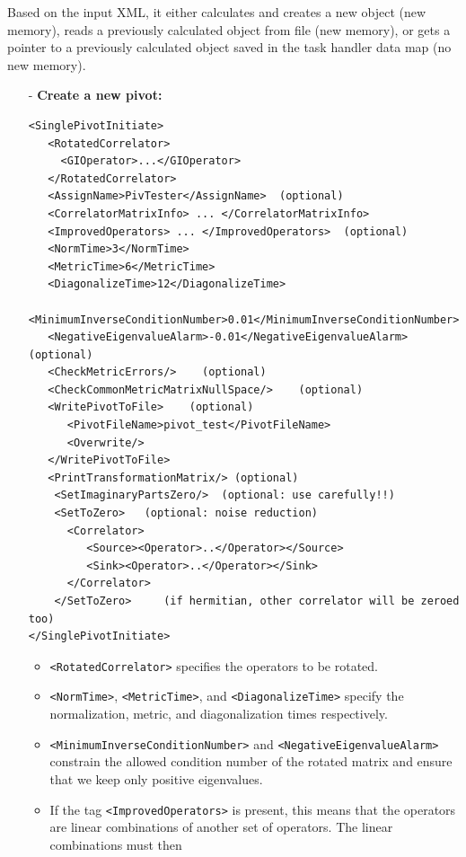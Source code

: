 \documentclass[12pt]{article}
\newcommand{\vb}{\texttt}
\begin{document}
Based on the input XML, it either calculates and creates a new object (new memory),
reads a previously calculated object from file (new memory), or gets a pointer to
a previously calculated object saved in the task handler data map (no new memory).

\begin{itemize}
\item[-] \textbf{Create a new pivot:}
\begin{verbatim}
<SinglePivotInitiate>
   <RotatedCorrelator>
     <GIOperator>...</GIOperator>
   </RotatedCorrelator>
   <AssignName>PivTester</AssignName>  (optional)
   <CorrelatorMatrixInfo> ... </CorrelatorMatrixInfo>
   <ImprovedOperators> ... </ImprovedOperators>  (optional)
   <NormTime>3</NormTime>
   <MetricTime>6</MetricTime>
   <DiagonalizeTime>12</DiagonalizeTime>
   <MinimumInverseConditionNumber>0.01</MinimumInverseConditionNumber>
   <NegativeEigenvalueAlarm>-0.01</NegativeEigenvalueAlarm>  (optional)
   <CheckMetricErrors/>    (optional)
   <CheckCommonMetricMatrixNullSpace/>    (optional)
   <WritePivotToFile>    (optional)
      <PivotFileName>pivot_test</PivotFileName>
      <Overwrite/>
   </WritePivotToFile>
   <PrintTransformationMatrix/> (optional)
    <SetImaginaryPartsZero/>  (optional: use carefully!!)                   
    <SetToZero>   (optional: noise reduction)                               
      <Correlator>                                                          
         <Source><Operator>..</Operator></Source>                           
         <Sink><Operator>..</Operator></Sink>                               
      </Correlator>                                                         
    </SetToZero>     (if hermitian, other correlator will be zeroed too)    
</SinglePivotInitiate>
\end{verbatim}
\begin{itemize}
\item \vb{<RotatedCorrelator>} specifies the operators to be rotated.
\item \vb{<NormTime>}, \vb{<MetricTime>}, and \vb{<DiagonalizeTime>} specify the normalization,
  metric, and diagonalization times respectively.
\item \vb{<MinimumInverseConditionNumber>} and \vb{<NegativeEigenvalueAlarm>} constrain the allowed
  condition number of the rotated matrix and ensure that we keep only positive eigenvalues.
\item If the tag \vb{<ImprovedOperators>} is present, this means that the operators are linear
combinations of another set of operators. The linear combinations must then

\end{itemize}
\end{itemize}
\end{document}
